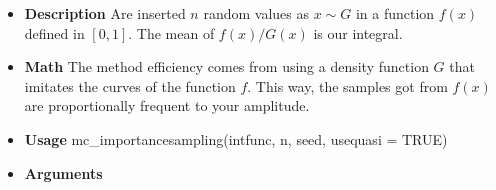 \documentclass{article}
\begin{document}
\begin{itemize}
    \item \textbf{Description}\newline
    Are inserted $n$ random values as $x \sim G$ in a function $f(x)$ defined in $[0,1]$. The mean of $f(x)/G(x)$ is our integral.
    
    \item \textbf{Math}\newline
    The method efficiency comes from using a density function $G$ that imitates the curves of the function $f$. This way, the samples got from $f(x)$ are proportionally frequent to your amplitude.
    
    \item \textbf{Usage}\newline
    mc\_importancesampling(intfunc, n, seed, usequasi = TRUE)
    
    \item \textbf{Arguments}
    

\end{itemize}
\end{document}
